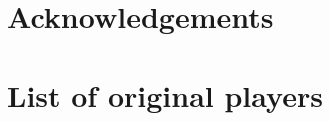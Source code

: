 \documentclass{article}
\begin{document}

\section*{Acknowledgements}





\appendix

\section{List of original players}\label{app:list_of_original_players}


\begin{multicols}{2}
    \begin{enumerate}
            
    \end{enumerate}
\end{multicols}
\end{document}
